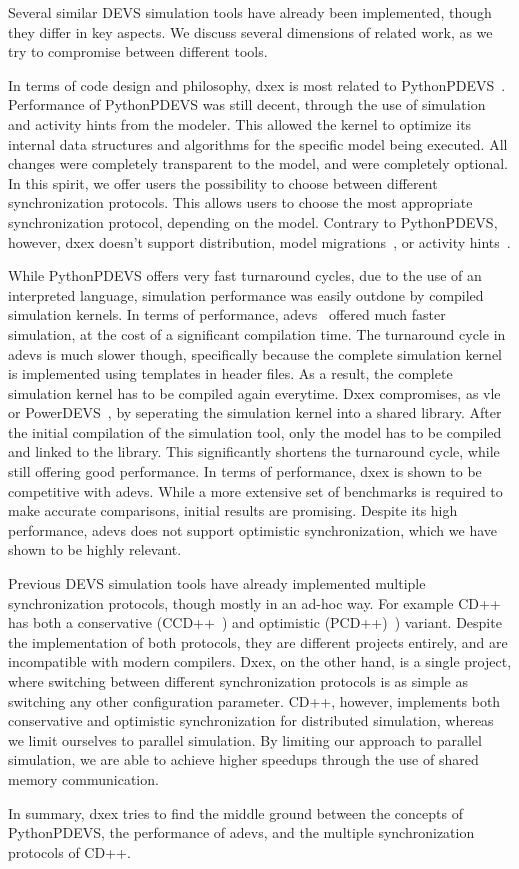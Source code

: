Several similar \textsf{DEVS} simulation tools have already been implemented, though they differ in key aspects.
We discuss several dimensions of related work, as we try to compromise between different tools.

In terms of code design and philosophy, dxex is most related to PythonPDEVS~\cite{PythonPDEVS}.
Performance of PythonPDEVS was still decent, through the use of simulation and activity hints from the modeler.
This allowed the kernel to optimize its internal data structures and algorithms for the specific model being executed.
All changes were completely transparent to the model, and were completely optional.
In this spirit, we offer users the possibility to choose between different synchronization protocols.
This allows users to choose the most appropriate synchronization protocol, depending on the model.
Contrary to PythonPDEVS, however, dxex doesn't support distribution, model migrations~\cite{PythonPDEVS2}, or activity hints~\cite{PythonPDEVS_ACTIMS}.

While PythonPDEVS offers very fast turnaround cycles, due to the use of an interpreted language, simulation performance was easily outdone by compiled simulation kernels.
In terms of performance, adevs~\cite{adevs} offered much faster simulation, at the cost of a significant compilation time.
The turnaround cycle in adevs is much slower though, specifically because the complete simulation kernel is implemented using templates in header files.
As a result, the complete simulation kernel has to be compiled again everytime.
Dxex compromises, as vle~\cite{vle} or PowerDEVS~\cite{PowerDEVS}, by seperating the simulation kernel into a shared library.
After the initial compilation of the simulation tool, only the model has to be compiled and linked to the library.
This significantly shortens the turnaround cycle, while still offering good performance.
In terms of performance, dxex is shown to be competitive with adevs.
While a more extensive set of benchmarks is required to make accurate comparisons, initial results are promising.
Despite its high performance, adevs does not support optimistic synchronization, which we have shown to be highly relevant.

Previous \textsf{DEVS} simulation tools have already implemented multiple synchronization protocols, though mostly in an ad-hoc way.
For example CD++~\cite{CD++} has both a conservative (CCD++~\cite{CCD++}) and optimistic (PCD++)~\cite{PCD++}) variant.
Despite the implementation of both protocols, they are different projects entirely, and are incompatible with modern compilers.
Dxex, on the other hand, is a single project, where switching between different synchronization protocols is as simple as switching any other configuration parameter.
CD++, however, implements both conservative and optimistic synchronization for distributed simulation, whereas we limit ourselves to parallel simulation.
By limiting our approach to parallel simulation, we are able to achieve higher speedups through the use of shared memory communication.

In summary, dxex tries to find the middle ground between the concepts of PythonPDEVS, the performance of adevs, and the multiple synchronization protocols of CD++.
